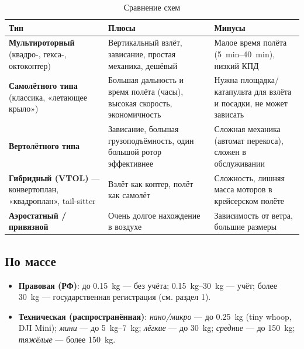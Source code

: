 \begin{table}[H]\centering\small
\renewcommand{\arraystretch}{1.3}
\begin{tabularx}{\linewidth}{@{}>{\raggedright\arraybackslash}p{33mm} X X@{}}
\toprule
\textbf{Тип} & \textbf{Плюсы} & \textbf{Минусы} \\
\midrule
\textbf{Мультироторный} (квадро-, гекса-, октокоптер) & Вертикальный взлёт, зависание, простая механика, дешёвый & Малое время полёта (\SIrange{5}{40}{\minute}), низкий КПД \\
\textbf{Самолётного типа} (классика, «летающее крыло») & Большая дальность и время полёта (часы), высокая скорость, экономичность & Нужна площадка/катапульта для взлёта и посадки, не может зависать \\
\textbf{Вертолётного типа} & Зависание, большая грузоподъёмность, один большой ротор эффективнее & Сложная механика (автомат перекоса), сложен в обслуживании \\
\textbf{Гибридный (VTOL)} — конвертоплан, «квадроплан», tail-sitter & Взлёт как коптер, полёт как самолёт & Сложность, лишняя масса моторов в крейсерском полёте \\
\textbf{Аэростатный / привязной} & Очень долгое нахождение в воздухе & Зависимость от ветра, большие размеры \\
\bottomrule
\end{tabularx}
\caption{Сравнение схем}
\end{table}

\subsection{По массе}
\begin{itemize}
\item \textbf{Правовая (РФ)}: до \SI{0.15}{\kilo\gram} — без учёта; \SIrange{0.15}{30}{\kilo\gram} — учёт; более \SI{30}{\kilo\gram} — государственная регистрация (см. раздел 1).
\item \textbf{Техническая (распространённая)}: \emph{нано/микро} — до \SI{0.25}{\kilo\gram} (tiny whoop, DJI Mini); \emph{мини} — до \SIrange{5}{7}{\kilo\gram}; \emph{лёгкие} — до \SI{30}{\kilo\gram}; \emph{средние} — до \SI{150}{\kilo\gram}; \emph{тяжёлые} — более \SI{150}{\kilo\gram}.
\end{itemize}

